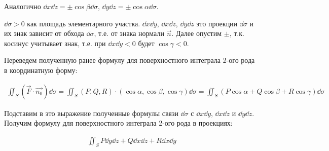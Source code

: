 Аналогично \(\dd x \dd z = \pm \cos \beta \dd \sigma\),
\(\dd y \dd z = \pm \cos \alpha \dd \sigma\).

\begin{remark}
  \(\dd \sigma > 0\) как площадь элементарного участка. \(\dd x \dd y\),
  \(\dd x \dd z\), \(\dd y \dd z\) это проекции \(\dd \sigma\) и их знак
  зависит от обхода \(\dd \sigma\), т.е. от знака нормали \(\vec{n}\). Далее
  опустим \(\pm\), т.к. косинус учитывает знак, т.е. при \(\dd x \dd y < 0\)
  будет \(\cos \gamma < 0\).
\end{remark}

Переведем полученную ранее формулу для поверхностного интеграла 2-ого рода в
координатную форму:

\begin{align*}\label{surf-int-coords}\tag{SIC}
  \iint_{S} (\vec{F} \cdot \vec{n_{0}}) \dd \sigma
  = \iint_{S} (P, Q, R) \cdot (\cos \alpha, \cos \beta, \cos \gamma) \dd \sigma
  = \iint_{S} (P \cos \alpha + Q \cos \beta + R \cos \gamma) \dd \sigma
\end{align*}

Подставим в это выражение полученные формулы связи \(\dd \sigma\) с
\(\dd x \dd y\), \(\dd x \dd z\) и \(\dd y \dd z\). Получим формулу для
поверхностного интеграла 2-ого рода в проекциях:

\begin{align*}\label{surf-int-proj}\tag{SIP}
  \iint_{S} P \dd y \dd z + Q \dd x \dd z + R \dd x \dd y
\end{align*}

